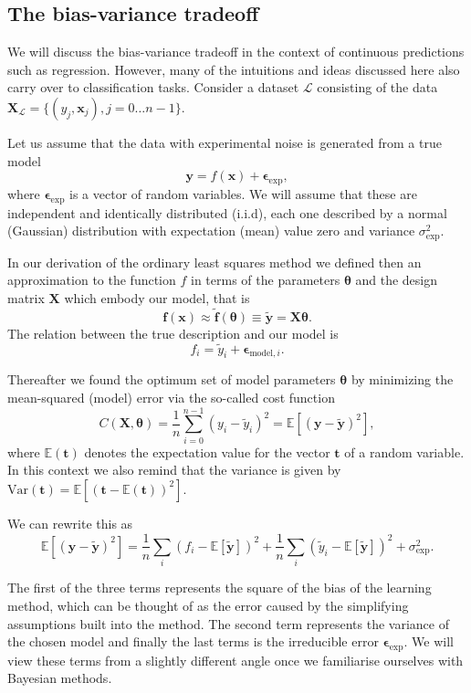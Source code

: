 \documentclass[%
oneside,                 %
final,                   %
10pt]{article}
\begin{document}
\subsection{The bias-variance tradeoff}

We will discuss the bias-variance tradeoff in the context of
continuous predictions such as regression. However, many of the
intuitions and ideas discussed here also carry over to classification
tasks. Consider a dataset $\mathcal{L}$ consisting of the data
$\mathbf{X}_\mathcal{L}=\{(y_j, \boldsymbol{x}_j), j=0\ldots n-1\}$. 

Let us assume that the data with experimental noise is generated from a true model
\[
\bm{y}=f(\boldsymbol{x}) + \bm{\epsilon}_\mathrm{exp},
\]
where $\bm{\epsilon}_\mathrm{exp}$ is a vector of random variables. We will assume that these are independent and identically distributed (i.i.d), each one described by a normal (Gaussian) distribution with expectation (mean) value zero and variance $\sigma^2_\mathrm{exp}$.

In our derivation of the ordinary least squares method we defined then
an approximation to the function $f$ in terms of the parameters
$\bm{\theta}$ and the design matrix $\bm{X}$ which embody our model,
that is 
\[
\bm{f}(\bm{x}) \approx \bm{\tilde{f}}(\bm{\theta}) \equiv \bm{\tilde{y}}=\bm{X}\bm{\theta}. 
\]
The relation between the true description and our model is
\[
f_i = \tilde{y}_i + \bm{\epsilon}_{\mathrm{model},i}.
\]

Thereafter we found the optimum set of model parameters $\bm{\theta}$ by minimizing the mean-squared (model) error via the so-called cost function
\[
C(\bm{X},\bm{\theta}) =\frac{1}{n}\sum_{i=0}^{n-1}(y_i-\tilde{y}_i)^2 = \mathbb{E}\left[(\bm{y}-\bm{\tilde{y}})^2\right],
\]
where $\mathbb{E}(\bm{t})$ denotes the expectation value for the vector $\bm{t}$ of a random variable. In this context we also remind that the variance is given by $\mathrm{Var}(\bm{t}) = \mathbb{E} \left[ \left(\bm{t} -  \mathbb{E}(\bm{t})\right)^2 \right]$.

We can rewrite this as 
\[
\mathbb{E}\left[(\bm{y}-\bm{\tilde{y}})^2\right]=\frac{1}{n}\sum_i(f_i-\mathbb{E}\left[\bm{\tilde{y}}\right])^2+\frac{1}{n}\sum_i(\tilde{y}_i-\mathbb{E}\left[\bm{\tilde{y}}\right])^2+\sigma^2_\mathrm{exp}.
\]

The first of the three terms represents the square of the bias of the learning
method, which can be thought of as the error caused by the simplifying
assumptions built into the method. The second term represents the
variance of the chosen model and finally the last terms is the irreducible error $\bm{\epsilon}_\mathrm{exp}$. We will view these terms from a slightly different angle once we familiarise ourselves with Bayesian methods.
\end{document}
